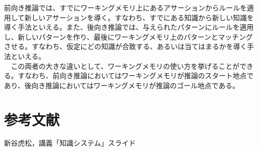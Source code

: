 \documentclass{jsarticle} %
\begin{document}
前向き推論では、すでにワーキングメモリ上にあるアサーションからルールを適用して新しいアサーションを導く。すなわち、すでにある知識から新しい知識を導く手法といえる。また、後向き推論では、与えられたパターンにルールを適用し、新しいパターンを作り、最後にワーキングメモリ上のパターンとマッチングさせる。すなわち、仮定にどの知識が合致する、あるいは当てはまるかを導く手法といえる。\\
　この両者の大きな違いとして、ワーキングメモリの使い方を挙げることができる。すなわち、前向き推論においてはワーキングメモリが推論のスタート地点であり、後向き推論においてはワーキングメモリが推論のゴール地点である。

\section{参考文献}

新谷虎松，講義「知識システム」スライド
\end{document}
